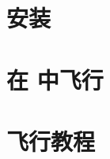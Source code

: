\newcommand{\longpage}{\enlargethispage{\baselineskip}}
\newcommand{\shortpage}{\enlargethispage{-\baselineskip}}

\usepackage{makeidx}
\makeindex
\makeglossary

\usepackage[
    a4paper,
    bookmarks,
    bookmarksopen=true,
    bookmarksnumbered=true,
    colorlinks,
    linkcolor=blue,
    urlcolor=blue
]{hyperref}
\hypersetup{unicode}





\ifchinese
\part{安装}
\fi


\ifchinese
\part{在 \FlightGear{} 中飞行}
\fi




\ifchinese
\part{飞行教程}
\fi





\ifchinese
